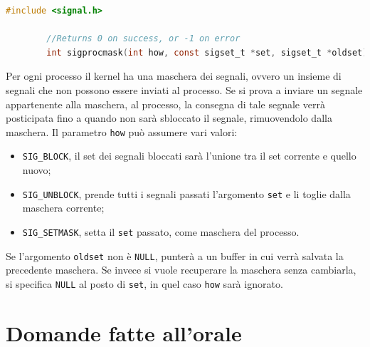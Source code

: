 \documentclass[a4paper, 12pt]{book}
\begin{document}
    \begin{lstlisting}[language=C]
        #include <signal.h>

        //Returns 0 on success, or -1 on error  
        int sigprocmask(int how, const sigset_t *set, sigset_t *oldset);
    \end{lstlisting}
    Per ogni processo il kernel ha una maschera dei segnali, 
    ovvero un insieme di segnali che non possono essere 
    inviati al processo. Se si prova a inviare un segnale 
    appartenente alla maschera, al processo, la consegna 
    di tale segnale verrà posticipata fino a quando 
    non sarà sbloccato il segnale, rimuovendolo dalla maschera.
    Il parametro \verb|how| può assumere vari valori:
    \begin{itemize}
        \item \verb|SIG_BLOCK|, il set dei segnali bloccati 
        sarà l'unione tra il set corrente e quello nuovo;
        \item \verb|SIG_UNBLOCK|, prende tutti i segnali passati
        l'argomento \verb|set| e li toglie dalla maschera corrente;
        \item \verb|SIG_SETMASK|, setta il \verb|set| passato, 
        come maschera del processo.
    \end{itemize}
    Se l'argomento \verb|oldset| non è \verb|NULL|, punterà 
    a un buffer in cui verrà salvata la precedente maschera.
    Se invece si vuole recuperare la maschera senza cambiarla, 
    si specifica \verb|NULL| al posto di \verb|set|, in quel 
    caso \verb|how| sarà ignorato.



    



    
    







    


     

    \chapter{Domande fatte all'orale}
\end{document}
